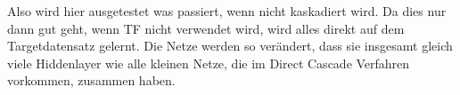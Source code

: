 Also wird hier ausgetestet was passiert, wenn nicht kaskadiert wird. Da dies nur dann gut geht, wenn TF nicht verwendet wird, wird alles direkt 
auf dem Targetdatensatz gelernt. Die Netze werden so verändert, dass sie insgesamt gleich viele Hiddenlayer wie alle kleinen Netze, die im 
Direct Cascade Verfahren vorkommen, zusammen haben. 

